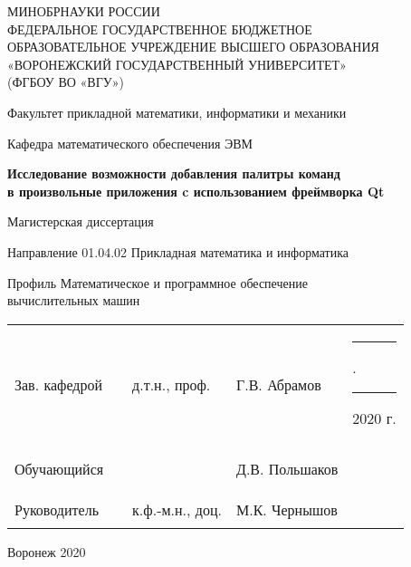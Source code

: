 \newcommand{\disserDepartment}{математического обеспечения ЭВМ}
\newcommand{\disserProgram}{01.04.02 Прикладная математика и информатика}
\newcommand{\disserTitle}{Исследование возможности добавления палитры команд \\
в произвольные приложения c использованием фреймворка Qt}
\newcommand{\disserProfile}{Математическое и программное обеспечение \\ вычислительных машин}

\newcommand{\disserHeadOfDepStatus}{д.т.н., проф.}
\newcommand{\disserHeadOfDepName}{Г.В. Абрамов}
\newcommand{\disserStudent}{Д.В. Польшаков}

\newcommand{\disserSupervisorStatus}{к.ф.-м.н., доц.}
\newcommand{\disserSupervisorName}{М.К. Чернышов}

\thispagestyle{empty}
\begin{center}
МИНОБРНАУКИ РОССИИ \\
ФЕДЕРАЛЬНОЕ ГОСУДАРСТВЕННОЕ БЮДЖЕТНОЕ \\
ОБРАЗОВАТЕЛЬНОЕ УЧРЕЖДЕНИЕ ВЫСШЕГО ОБРАЗОВАНИЯ \\
«ВОРОНЕЖСКИЙ ГОСУДАРСТВЕННЫЙ УНИВЕРСИТЕТ» \\
(ФГБОУ ВО «ВГУ»)

\vspace{2ex}

Факультет прикладной математики, информатики и механики

\vspace{2ex}

Кафедра \disserDepartment{}

\vspace{3.5cm}
\textbf{\disserTitle}

\vspace{1cm}
Магистерская диссертация

\vspace{0.5cm}
Направление \disserProgram{}

\vspace{0.5cm}
Профиль \disserProfile{}

\vspace{4cm}

\begin{center}
  \begin{tabular}{ l l l l l }
    Зав. кафедрой & \rule{25mm}{0.1mm} & \disserHeadOfDepStatus{}  & \disserHeadOfDepName{} & \rule{7mm}{0.1mm}.\rule{7mm}{0.1mm} 2020 г.  \\
    & \\
    Обучающийся   & \rule{25mm}{0.1mm} &                           & \disserStudent{} & \\
    & \\
    Руководитель  & \rule{25mm}{0.1mm} & \disserSupervisorStatus{} & \disserSupervisorName{} & \\
  \end{tabular}
\end{center}

\vspace{3cm}
Воронеж 2020
\end{center}
